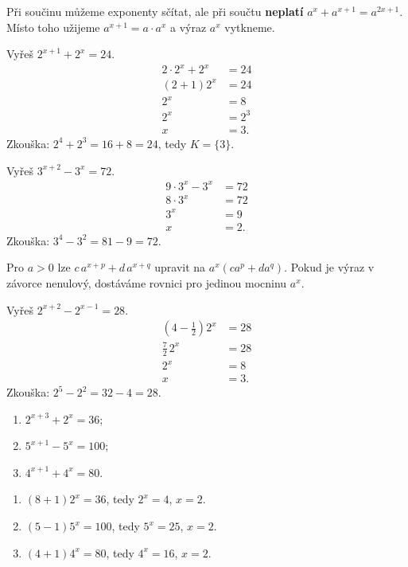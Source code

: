 \documentclass[11pt,a4paper]{article}
\begin{document}
Při součinu můžeme exponenty sčítat, ale při součtu \textbf{neplatí} $a^x+a^{x+1}=a^{2x+1}$. Místo toho užijeme $a^{x+1}=a\cdot a^x$ a výraz $a^x$ vytkneme.\par
\begin{prikladReseniBox}[title={Příklad 1}]
Vyřeš $2^{x+1}+2^x=24$.
\tcblower
\[\begin{aligned}2\cdot2^x+2^x&=24\\(2+1)2^x&=24\\2^x&=8\\2^x&=2^3\\x&=3.\end{aligned}\]
Zkouška: $2^4+2^3=16+8=24$, tedy $K=\{3\}$.
\end{prikladReseniBox}
\begin{prikladReseniBox}[title={Příklad 2}]
Vyřeš $3^{x+2}-3^x=72$.
\tcblower
\[\begin{aligned}9\cdot3^x-3^x&=72\\8\cdot3^x&=72\\3^x&=9\\x&=2.\end{aligned}\]
Zkouška: $3^4-3^2=81-9=72$.
\end{prikladReseniBox}
\begin{zadaniBox}[title={Věta - Vytknutí společné exponenciální mocniny}]
Pro $a>0$ lze $c\,a^{x+p}+d\,a^{x+q}$ upravit na $a^x(ca^p+da^q)$. Pokud je výraz v závorce nenulový, dostáváme rovnici pro jedinou mocninu $a^x$.
\end{zadaniBox}
\begin{prikladReseniBox}[title={Příklad 3}]
Vyřeš $2^{x+2}-2^{x-1}=28$.
\tcblower
\[\begin{aligned}(4-\tfrac12)2^x&=28\\\tfrac72\,2^x&=28\\2^x&=8\\x&=3.\end{aligned}\]
Zkouška: $2^5-2^2=32-4=28$.
\end{prikladReseniBox}
\begin{zadaniReseniBox}[title={Samostatná práce 1}]
\begin{enumerate}[label=\alph*)]
\item $2^{x+3}+2^x=36$;
\item $5^{x+1}-5^x=100$;
\item $4^{x+1}+4^x=80$.
\end{enumerate}
\tcblower
\begin{enumerate}[label=\alph*)]
\item $(8+1)2^x=36$, tedy $2^x=4$, $x=2$.
\item $(5-1)5^x=100$, tedy $5^x=25$, $x=2$.
\item $(4+1)4^x=80$, tedy $4^x=16$, $x=2$.
\end{enumerate}
\end{zadaniReseniBox}
\end{document}
